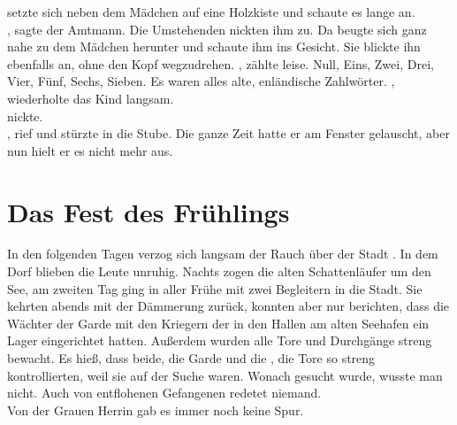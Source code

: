 \begin{Large}
{\Nox} setzte sich neben dem Mädchen auf eine Holzkiste und schaute es lange an.\\
, sagte der Amtmann.  Die Umstehenden nickten ihm zu. Da beugte sich {\Nox} ganz nahe zu dem Mädchen herunter und schaute ihm ins Gesicht. Sie blickte ihn ebenfalls an, ohne den Kopf wegzudrehen. \q{{\Oka}, {\Nia}, {\Dua}, {\Ria}, {\Tea}, {\Pia}, {\Exa}, {\Sepa}}, zählte {\Nox} leise. Null, Eins, Zwei, Drei, Vier, Fünf, Sechs, Sieben. Es waren alles alte, enländische Zahlwörter. \q{{\Sepa}}, wiederholte das Kind langsam.\\
 {\Nox} nickte. \\
\q{{\Siebenhoffnung}!}, rief {\Piedo} und stürzte in die Stube. Die ganze Zeit hatte er am Fenster gelauscht, aber nun hielt er es nicht mehr aus. 

\chapter{Das Fest des Frühlings}
In den folgenden Tagen verzog sich langsam der Rauch über der Stadt {\Tern}. In dem Dorf {\Berna} blieben die Leute unruhig. Nachts zogen die alten Schattenläufer um den See, am zweiten Tag ging in aller Frühe {\Nox} mit zwei Begleitern in die Stadt. Sie kehrten abends mit der Dämmerung zurück, konnten aber nur berichten, dass die Wächter der Garde mit den Kriegern der {\Bangiri} in den Hallen am alten Seehafen ein Lager eingerichtet hatten. Außerdem wurden alle Tore und Durchgänge streng bewacht. Es hieß, dass beide, die Garde und die {\Bangiri}, die Tore so streng kontrollierten, weil sie auf der Suche waren. Wonach gesucht wurde, wusste man nicht. Auch von entflohenen Gefangenen redetet niemand.\\
Von der Grauen Herrin gab es immer noch keine Spur. 


\end{Large}
